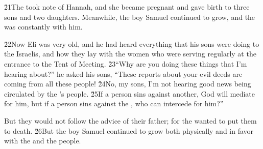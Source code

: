 \v{21}The  took note of Hannah, and she became pregnant and gave birth to three sons and two daughters. Meanwhile, the boy Samuel continued to grow, and the  was constantly with him.

\v{22}Now Eli was very old, and he had heard everything that his sons were doing to the Israelis, and how they lay with the women who were serving regularly at the entrance to the Tent of Meeting. \v{23}``Why are you doing these things that I'm hearing about?'' he asked his sons, ``These reports about your evil deeds are coming from all these people! \v{24}No, my sons, I'm not hearing good news being circulated by the 's people. \v{25}If a person sins against another, God will mediate for him, but if a person sins against the , who can intercede for him?''

But they would not follow the advice of their father; for the  wanted to put them to death. \v{26}But the boy Samuel continued to grow both physically and in favor with the  and the people.

